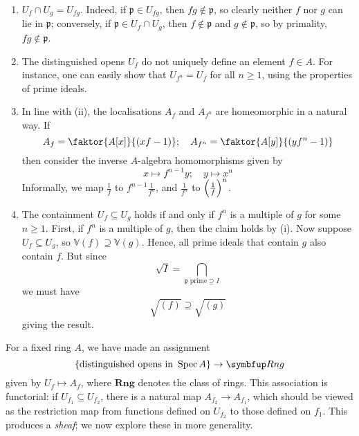 \begin{remark}
    \begin{enumerate}
        \item \( U_f \cap U_g = U_{fg} \).
        Indeed, if \( \mathfrak p \in U_{fg} \), then \( fg \notin \mathfrak p \), so clearly neither \( f \) nor \( g \) can lie in \( \mathfrak p \); conversely, if \( \mathfrak p \in U_f \cap U_g \), then \( f \notin \mathfrak p \) and \( g \notin \mathfrak p \), so by primality, \( fg \notin \mathfrak p \).
        \item The distinguished opens \( U_f \) do not uniquely define an element \( f \in A \).
        For instance, one can easily show that \( U_{f^n} = U_f \) for all \( n \geq 1 \), using the properties of prime ideals.
        \item In line with (ii), the localisations \( A_f \) and \( A_{f^n} \) are homeomorphic in a natural way.
        If
        \[ A_f = \faktor{A[x]}{(xf - 1)};\quad A_{f^n} = \faktor{A[y]}{(yf^n - 1)} \]
        then consider the inverse \( A \)-algebra homomorphisms given by
        \[ x \mapsto f^{n-1} y;\quad y \mapsto x^n \]
        Informally, we map \( \frac{1}{f} \) to \( f^{n-1} \frac{1}{f^n} \), and \( \frac{1}{f^n} \) to \( \qty(\frac{1}{f})^n \).
        \item The containment \( U_f \subseteq U_g \) holds if and only if \( f^n \) is a multiple of \( g \) for some \( n \geq 1 \).
        First, if \( f^n \) is a multiple of \( g \), then the claim holds by (i).
        Now suppose \( U_f \subseteq U_g \), so \( \mathbb V(f) \supseteq \mathbb V(g) \).
        Hence, all prime ideals that contain \( g \) also contain \( f \).
        But since
        \[ \sqrt{I} = \bigcap_{\mathfrak p \text{ prime} \supseteq I} \]
        we must have
        \[ \sqrt{(f)} \supseteq \sqrt{(g)} \]
        giving the result.
    \end{enumerate}
\end{remark}
\begin{remark}
    For a fixed ring \( A \), we have made an assignment
    \[ \qty{\text{distinguished opens in } \Spec A} \to \mathbf{Rng} \]
    given by \( U_f \mapsto A_f \), where \( \mathbf{Rng} \) denotes the class of rings.
    This association is functorial: if \( U_{f_1} \subseteq U_{f_2} \), there is a natural map \( A_{f_2} \to A_{f_1} \), which should be viewed as the restriction map from functions defined on \( U_{f_2} \) to those defined on \( f_1 \).
    This produces a \emph{sheaf}; we now explore these in more generality.
\end{remark}

